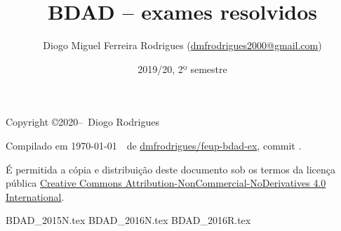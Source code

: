 \documentclass{bdad}
\title{BDAD -- exames resolvidos}
\author{Diogo Miguel Ferreira Rodrigues (\href{mailto:dmfrodrigues2000@gmail.com}{dmfrodrigues2000@gmail.com})}
\date{2019/20, 2º semestre}
\begin{document}
\maketitle
\begin{secondpage}
    Copyright \copyright 2020--\the\year\ Diogo Rodrigues\par
    \par
    \immediate{}
    Compilado em \today~\currenttime~de \href{https://github.com/dmfrodrigues/feup-bdad-ex}{dmfrodrigues/feup-bdad-ex}, commit \unskip.\par
    É permitida a cópia e distribuição deste documento sob os termos da licença pública
    \href{https://creativecommons.org/licenses/by-nc-nd/4.0/}{Creative Commons Attribution-NonCommercial-NoDerivatives 4.0 International}.
\end{secondpage}
\frontmatter
\tableofcontents
\mainmatter
{BDAD_2015N.tex}
{BDAD_2016N.tex}
{BDAD_2016R.tex}
\end{document}
